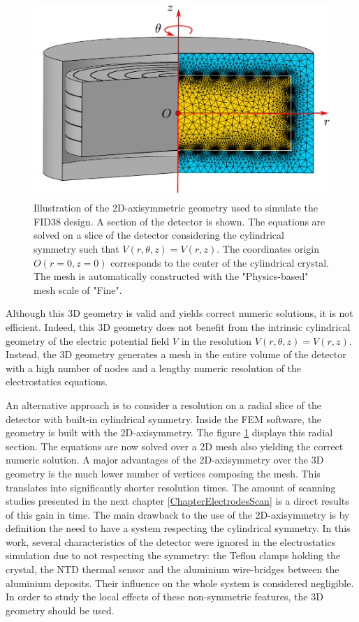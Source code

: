 \begin{figure}
\centering
\includegraphics[scale=0.7]{Figures/Electrodes/mesh_3d.pdf}
\caption{Illustration of the 2D-axisymmetric geometry used to simulate the FID38 design. A section of the detector is shown. The equations are solved on a slice of the detector considering the cylindrical symmetry such that $V(r, \theta, z) = V(r,z)$. The coordinates origin $O(r=0, z=0)$ corresponds to the center of the cylindrical crystal. The mesh is automatically constructed with the "Physics-based" mesh scale of "Fine".}
\label{fig:space-dimension-geometry}
\end{figure}

Although this 3D geometry is valid and yields correct numeric solutions, it is not efficient. Indeed, this 3D geometry does not benefit from the intrinsic cylindrical geometry of the electric potential field $V$ in the resolution $V(r, \theta, z) = V(r,z)$. Instead, the 3D geometry generates a mesh in the entire volume of the detector with a high number of nodes and a lengthy numeric resolution of the electrostatics equations.

An alternative approach is to consider a resolution on a radial slice of the detector with built-in cylindrical symmetry. Inside the FEM software, the geometry is built with the 2D-axisymmetry. The figure \ref{fig:space-dimension-geometry} displays this radial section. The equations are now solved over a 2D mesh also yielding the correct numeric solution. A major advantages of the 2D-axisymmetry over the 3D geometry is the much lower number of vertices composing the mesh. This translates into significantly shorter resolution times. The amount of scanning studies presented in the next chapter \ref{ChapterElectrodesScan} is a direct results of this gain in time. The main drawback to the use of the 2D-axisymmetry is by definition the need to have a system respecting the cylindrical symmetry. In this work, several characteristics of the detector were ignored in the electrostatics simulation due to not respecting the symmetry: the Teflon clamps holding the crystal, the NTD thermal sensor and the aluminium wire-bridges between the aluminium deposits. Their influence on the whole system is considered negligible. In order to study the local effects of these non-symmetric features, the 3D geometry should be used.


